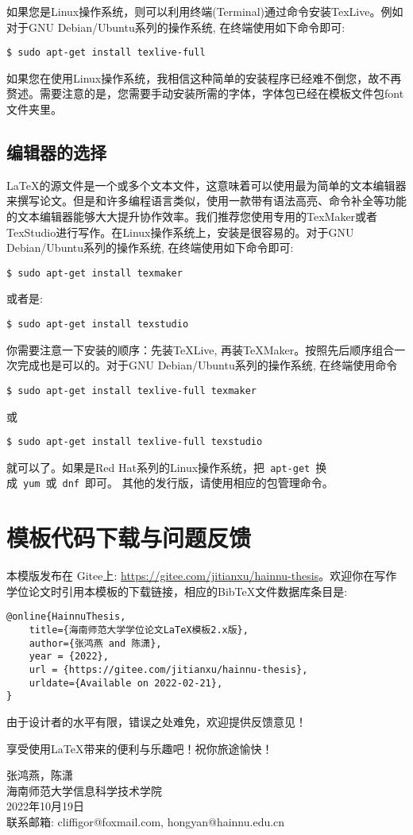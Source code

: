 如果您是Linux操作系统，则可以利用终端(Terminal)通过命令安装TexLive。例如对于GNU Debian/Ubuntu系列的操作系统, 在终端使用如下命令即可:
\begin{lstlisting}[frame=shadowbox]
	$ sudo apt-get install texlive-full
\end{lstlisting}
如果您在使用Linux操作系统，我相信这种简单的安装程序已经难不倒您，故不再赘述。需要注意的是，您需要手动安装所需的字体，字体包已经在模板文件包font文件夹里。

\subsection*{编辑器的选择}
\LaTeX 的源文件是一个或多个文本文件，这意味着可以使用最为简单的文本编辑器来撰写论文。但是和许多编程语言类似，使用一款带有语法高亮、命令补全等功能的文本编辑器能够大大提升协作效率。我们推荐您使用专用的TexMaker或者TexStudio进行写作。在Linux操作系统上，安装是很容易的。对于GNU Debian/Ubuntu系列的操作系统, 在终端使用如下命令即可:
\begin{lstlisting}[frame=shadowbox]
	$ sudo apt-get install texmaker
\end{lstlisting}
或者是:
\begin{lstlisting}[frame=shadowbox]
	$ sudo apt-get install texstudio
\end{lstlisting}
你需要注意一下安装的顺序：先装TeXLive, 再装TeXMaker。按照先后顺序组合一次完成也是可以的。对于GNU Debian/Ubuntu系列的操作系统, 在终端使用命令
\begin{lstlisting}[frame=shadowbox]
	$ sudo apt-get install texlive-full texmaker
\end{lstlisting}
或
\begin{lstlisting}[frame=shadowbox]
	$ sudo apt-get install texlive-full texstudio
\end{lstlisting}
就可以了。如果是Red Hat系列的Linux操作系统，把~\verb|apt-get|~换成~\verb|yum|~或~\verb|dnf|~即可。
其他的发行版，请使用相应的包管理命令。

\newpage

\section*{模板代码下载与问题反馈}

本模版发布在 Gitee上: \url{https://gitee.com/jitianxu/hainnu-thesis}。欢迎你在写作学位论文时引用本模板的下载链接，相应的BibTeX文件数据库条目是:
\begin{verbatim}
@online{HainnuThesis,
	title={海南师范大学学位论文LaTeX模板2.x版},
	author={张鸿燕 and 陈潇},
	year = {2022},
	url = {https://gitee.com/jitianxu/hainnu-thesis},
	urldate={Available on 2022-02-21},	
}
\end{verbatim}

{由于设计者的水平有限，错误之处难免，欢迎提供反馈意见！}

享受使用{\LaTeX{}}带来的便利与乐趣吧！祝你旅途愉快！

\begin{flushright}
	张鸿燕，陈潇\\
	海南师范大学信息科学技术学院\\
	2022年10月19日\\
	联系邮箱: cliffigor@foxmail.com, hongyan@hainnu.edu.cn
\end{flushright}